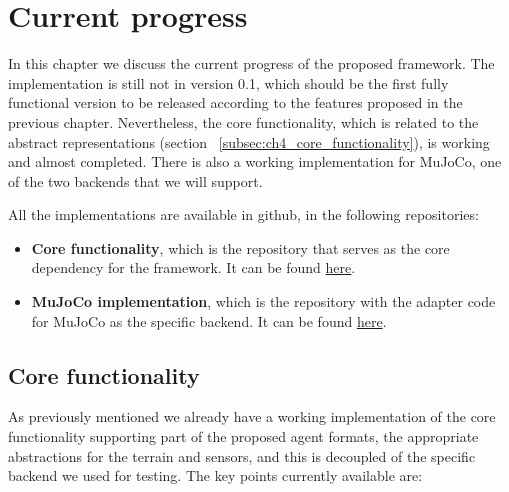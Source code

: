 
\chapter{Current progress}
\label{ch:current_progress}




In this chapter we discuss the current progress of the proposed framework. 
The implementation is still not in version 0.1, which should be the first 
fully functional version to be released according to the features proposed 
in the previous chapter. Nevertheless, the core functionality, which is related
to the abstract representations (section ~\ref{subsec:ch4_core_functionality}),
is working and almost completed. There is also a working implementation for
MuJoCo, one of the two backends that we will support.

All the implementations are available in github, in the following repositories:

\begin{itemize}
    \item \textbf{Core functionality}, which is the repository that serves as the
          core dependency for the framework. It can be found \href{https://github.com/wpumacay/tysocCore}{here}.
    \item \textbf{MuJoCo implementation}, which is the repository with the
          adapter code for MuJoCo as the specific backend. It can be found
          \href{https://github.com/wpumacay/tysocMjc}{here}.
\end{itemize}

\section{Core functionality}

As previously mentioned we already have a working implementation of the core
functionality supporting part of the proposed agent formats, the appropriate
abstractions for the terrain and sensors, and this is decoupled of the specific
backend we used for testing. The key points currently available are:

